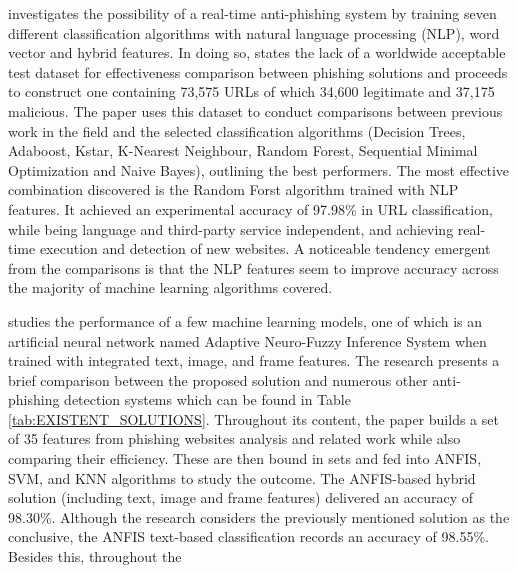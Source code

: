 \cite{Sahingoz_Ozgur} investigates the possibility of a real-time anti-phishing system by training seven different classification algorithms with natural language processing (NLP), word vector and hybrid features. In doing so, \cite{Sahingoz_Ozgur} states the lack of a worldwide acceptable test dataset for effectiveness comparison between phishing solutions and proceeds to construct one containing 73,575 URLs of which 34,600 legitimate and 37,175 malicious. The paper uses this dataset to conduct comparisons between previous work in the field and the selected classification algorithms (Decision Trees, Adaboost, Kstar, K-Nearest Neighbour, Random Forest, Sequential Minimal Optimization and Naive Bayes), outlining the best performers. The most effective combination discovered is the Random Forst algorithm trained with NLP features. It achieved an experimental accuracy of 97.98\% in URL classification, while being language and third-party service independent, and achieving real-time execution and detection of new websites. A noticeable tendency emergent from the comparisons is that the NLP features seem to improve accuracy across the majority of machine learning algorithms covered.

\cite{Adebowale} studies the performance of a few machine learning models, one of which is an artificial neural network named Adaptive Neuro-Fuzzy Inference System \citep{Jang} when trained with integrated text, image, and frame features. The research presents a brief comparison between the proposed solution and numerous other anti-phishing detection systems which can be found in Table \ref{tab:EXISTENT_SOLUTIONS}.
Throughout its content, the paper builds a set of 35 features from phishing websites analysis and related work while also comparing their efficiency. These are then bound in sets and fed into ANFIS, SVM, and KNN algorithms to study the outcome.
The ANFIS-based hybrid solution (including text, image and frame features) delivered an accuracy of 98.30\%. Although the research considers the previously mentioned solution as the conclusive, the ANFIS text-based classification records an accuracy of 98.55\%. Besides this, throughout the

